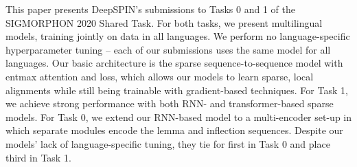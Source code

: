 This paper presents DeepSPIN's submissions to Tasks 0 and 1 of the SIGMORPHON 2020 Shared Task. For both tasks, we present multilingual models, training jointly on data in all languages. We perform no language-specific hyperparameter tuning -- each of our submissions uses the same model for all languages. Our basic architecture is the sparse sequence-to-sequence model with entmax attention and loss, which allows our models to learn sparse, local alignments while still being trainable with gradient-based techniques. For Task 1, we achieve strong performance with both RNN- and transformer-based sparse models. For Task 0, we extend our RNN-based model to a multi-encoder set-up in which separate modules encode the lemma and inflection sequences. Despite our models' lack of language-specific tuning, they tie for first in Task 0 and place third in Task 1.
